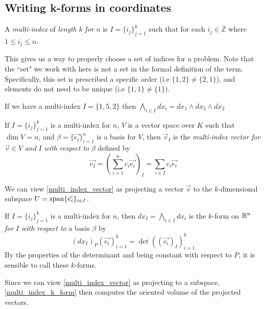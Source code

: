 \documentclass[notes]{subfiles}
\begin{document}
\subsection{Writing k-forms in coordinates}
\begin{definition}
    A \textit{multi-index} of \textit{length} $k$ \textit{for} $n$ is $I = \{i_j\}_{j = 1}^k$ such that for each $i_j \in \mathbb{Z}$ where $1 \leq i_j \leq n$.
\end{definition}
This gives us a way to properly choose a set of indices for a problem. Note that the ``set" we work with here is not a set in the formal definition of the term. Specifically, this set is prescribed a specific order (i.e $\{ 1, 2 \} \neq \{ 2, 1 \}$), and elements do not need to be unique (i.e $\{ 1, 1 \} \neq \{ 1 \}$).

\begin{example}
    If we have a multi-index $I = \{1, 5, 2\}$ then $\bigwedge_{i \in I} dx_i = dx_1 \wedge dx_5 \wedge dx_2$
\end{example}

\begin{definition} \label{multi_index_vector}
    If $I = \{ i_j \}_{j = 1}^k$ is a multi-index for $n$, $V$ is a vector space over $K$ such that $\dim V = n$, and $\beta = \{ \vec{e_i} \}_{i = 1}^n$ is a basis for $V$, then $\vec{v}_I$ is the \textit{multi-index vector for} $\vec{v} \in V$ \textit{and} $I$ \textit{with respect to} $\beta$ defined by
    \[
        \vec{v_I} = \left(\sum_{i = 1}^n c_i\vec{e_i}\right)_I
        = \sum_{i \in I} c_i\vec{e_i}
    \]
\end{definition}
We can view \cref{multi_index_vector} as projecting a vector $\vec{v}$ to the $k$-dimensional subspace $U = \operatorname{span} \{ \vec{e_i} \}_{i \in I}$.

\begin{definition} \label{multi_index_k_form}
    If $I = \{ i_j \}_{j = 1}^k$ is a multi-index for $n$, then $dx_I = \bigwedge_{i \in I} dx_i$ is the $k$-form on $\mathbb{R}^n$ \textit{for} $I$ \textit{with respect to} a basis $\beta$ by
    \[
        (dx_I)_P(\vec{v_i})_{i = 1}^k
        = \det({(\vec{v_i})_I})_{i = 1}^k
    \]
    By the properties of the determinant and being constant with respect to $P$, it is sensible to call these $k$-forms.
\end{definition}

Since we can view \cref{multi_index_vector} as projecting to a subspace, \cref{multi_index_k_form} then computes the oriented volume of the projected vectors.
\end{document}

